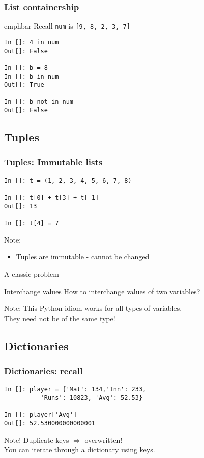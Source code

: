 \documentclass[14pt,compress]{beamer}
\newcommand{\emphbar}[1]
{\begin{beamercolorbox}[rounded=true]{emphbar} 
      {#1}
 \end{beamercolorbox}
}
\newcounter{time}
\newcommand{\inctime}[1]{\addtocounter{time}{#1}{\tiny \thetime\ m}}
\newcommand{\typ}[1]{\lstinline{#1}}
\begin{document}
\begin{frame}[fragile]
\frametitle{List containership}
\emphbar{Recall \typ{num} is \typ{[9, 8, 2, 3, 7]}}
\begin{lstlisting}
In []: 4 in num
Out[]: False

In []: b = 8
In []: b in num
Out[]: True

In []: b not in num
Out[]: False
\end{lstlisting}
\end{frame}

\subsection{Tuples}
\begin{frame}[fragile]
\frametitle{Tuples: Immutable lists}
\begin{lstlisting}
In []: t = (1, 2, 3, 4, 5, 6, 7, 8)

In []: t[0] + t[3] + t[-1]
Out[]: 13

In []: t[4] = 7 
\end{lstlisting}
\pause
\begin{block}{Note:}
\begin{itemize}
  \item Tuples are immutable - cannot be changed
\end{itemize}
\end{block}
  \inctime{10}
\end{frame}

\begin{frame}
  {A classic problem}
  \begin{block}
    {Interchange values}
    How to interchange values of two variables? 
  \end{block}
  \pause
  \begin{block}{Note:}
    This Python idiom works for all types of variables.\\
They need not be of the same type!
  \end{block}
\end{frame}

\subsection{Dictionaries}
\begin{frame}[fragile]
  \frametitle{Dictionaries: recall}
  \begin{lstlisting}
In []: player = {'Mat': 134,'Inn': 233,
          'Runs': 10823, 'Avg': 52.53}

In []: player['Avg']
Out[]: 52.530000000000001
  \end{lstlisting}
  \begin{block}{Note!}
    Duplicate keys $\Rightarrow$ overwritten!\\
    You can iterate through a dictionary using keys.
  \end{block}
\end{frame}
\end{document}
